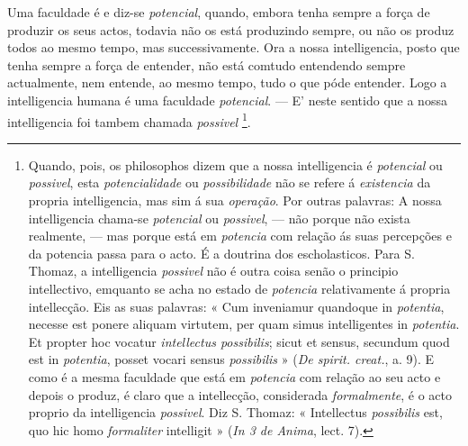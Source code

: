 
    
Uma faculdade é e diz-se \emph{potencial}, quando, embora tenha sempre a força de produzir os seus actos, todavia não os está produzindo sempre, ou não os produz todos ao mesmo tempo, mas successivamente. Ora a nossa intelligencia, posto que tenha sempre a força de entender, não está comtudo entendendo sempre actualmente, nem entende, ao mesmo tempo, tudo o que póde entender. Logo a intelligencia humana é uma faculdade \emph{potencial}. --- E' neste sentido que a nossa intelligencia foi tambem chamada \emph{possivel} \footnote{Quando, pois, os philosophos dizem que a nossa intelligencia é \emph{potencial} ou \emph{possivel}, esta \emph{potencialidade} ou \emph{possibilidade} não se refere á \emph{existencia} da propria intelligencia, mas sim á sua \emph{operação}. Por outras palavras: A nossa intelligencia chama-se \emph{potencial} ou \emph{possivel}, --- não porque não exista realmente, --- mas porque está em \emph{potencia} com relação ás suas percepções e da potencia passa para o acto. É a doutrina dos escholasticos. Para S. Thomaz, a intelligencia \emph{possivel} não é outra coisa senão o principio intellectivo, emquanto se acha no estado de \emph{potencia} relativamente á propria intellecção. Eis as suas palavras: « Cum inveniamur quandoque in \emph{potentia}, necesse est ponere aliquam virtutem, per quam simus intelligentes in \emph{potentia}. Et propter hoc vocatur \emph{intellectus possibilis}; sicut et sensus, secundum quod est in \emph{potentia}, posset vocari sensus \emph{possibilis} » (\emph{De spirit. creat.}, a. 9). E como é a mesma faculdade que está em \emph{potencia} com relação ao seu acto e depois o produz, é claro que a intellecção, considerada \emph{formalmente}, é o acto proprio da intelligencia \emph{possivel}. Diz S. Thomaz: « Intellectus \emph{possibilis} est, quo hic homo \emph{formaliter} intelligit » (\emph{In 3 de Anima}, lect. 7).}.


